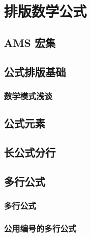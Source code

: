 \chapter{排版数学公式}

\leavevmode\nobreakspace

\section{AMS 宏集}

\leavevmode\nobreakspace

\section{公式排版基础}

\leavevmode\nobreakspace

\subsection{数学模式浅谈}

\leavevmode\nobreakspace

\section{公式元素}

\leavevmode\nobreakspace

\section{长公式分行}

\leavevmode\nobreakspace

\section{多行公式}

\leavevmode\nobreakspace

\subsection{多行公式}

\leavevmode\nobreakspace

\subsection{公用编号的多行公式}

\leavevmode\nobreakspace

